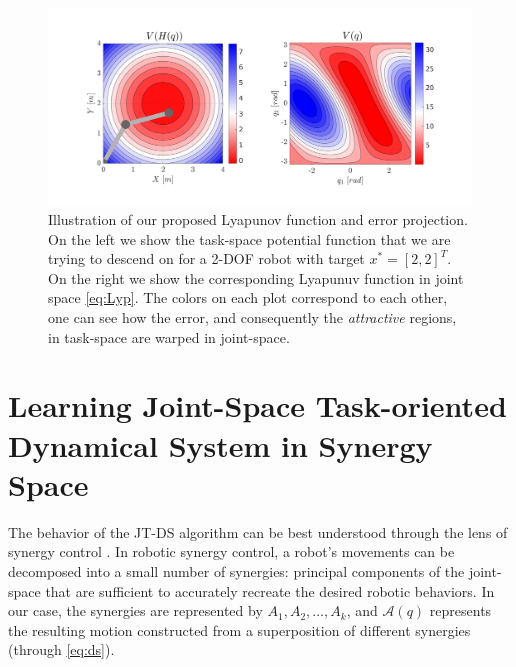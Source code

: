 \documentclass[letterpaper, 10 pt, conference,fleqn]{ieeeconf}
\begin{document}

\begin{figure}[t]
	\centering
	\includegraphics[width=\linewidth,trim={2.5cm 1.75cm 2.5cm 2cm},clip]{../Pic/Sources/Schematic_final.pdf}
	\caption{Illustration of our proposed Lyapunov function and error projection. On the left we show the task-space potential function that we are trying to descend on for a 2-DOF robot with target $x^*=[2,2]^T$. On the right we show the corresponding Lyapunuv function in joint space \eqref{eq:Lyp}. The colors on each plot correspond to each other, one can see how the error, and consequently the \textit{attractive} regions, in task-space are warped in joint-space.}
	\label{fig:error_schematic}
	\vspace{-15pt}
\end{figure}


\section{Learning \textbf{J}oint-Space \textbf{T}ask-oriented \textbf{D}ynamical \textbf{S}ystem in Synergy Space} 
\label{Sec:Learning}

The behavior of the JT-DS algorithm can be best understood through the lens of synergy control \cite{7954741}. In robotic synergy control, a robot's movements can be decomposed into a small number of synergies: principal components of the joint-space that are sufficient to accurately recreate the desired robotic behaviors. In our case, the synergies are represented by $A_1, A_2, \dots, A_k$, and $\mathcal{A}(q)$ represents the resulting motion constructed from a superposition of different synergies (through \eqref{eq:ds}). 
\end{document}
